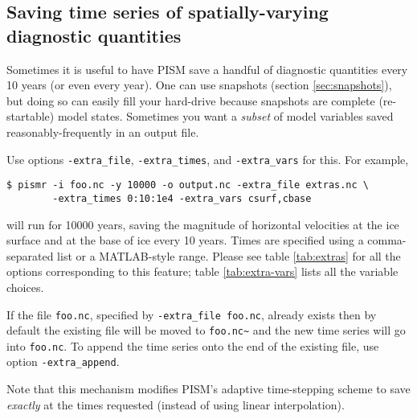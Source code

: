 \subsection{Saving time series of spatially-varying diagnostic quantities}
\label{sec:saving-spat-vari}

Sometimes it is useful to have PISM save a handful of diagnostic quantities every 10 years (or even every year).  One can use snapshots (section \ref{sec:snapshots}), but doing so can easily fill your hard-drive because snapshots are complete (re-startable) model states.  Sometimes you want a \emph{subset} of model variables saved reasonably-frequently in an output file.

Use options \texttt{-extra_file}, \texttt{-extra_times}, and \texttt{-extra_vars} for this.  For example,
\begin{verbatim}
$ pismr -i foo.nc -y 10000 -o output.nc -extra_file extras.nc \
        -extra_times 0:10:1e4 -extra_vars csurf,cbase
\end{verbatim}
will run for 10000 years, saving the magnitude of horizontal velocities at the ice surface and at the base of ice every 10 years. Times are specified using a comma-separated list or a MATLAB-style range. Please see table \ref{tab:extras} for all the options corresponding to this feature; table \ref{tab:extra-vars} lists all the variable choices. 

If the file \texttt{foo.nc}, specified by \texttt{-extra_file foo.nc}, already exists then by default the existing file will be moved to \texttt{foo.nc\~} and the new time series will go into \texttt{foo.nc}.  To append the time series onto the end of the existing file, use option \texttt{-extra_append}.

Note that this mechanism modifies PISM's adaptive time-stepping scheme to save
\emph{exactly} at the times requested (instead of using linear interpolation).

